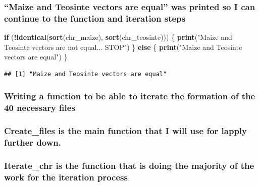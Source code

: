 \documentclass[
]{article}
\newenvironment{Shaded}{\begin{snugshade}}{\end{snugshade}}
\newcommand{\ControlFlowTok}[1]{\textcolor[rgb]{0.13,0.29,0.53}{\textbf{#1}}}
\newcommand{\FunctionTok}[1]{\textcolor[rgb]{0.13,0.29,0.53}{\textbf{#1}}}
\newcommand{\NormalTok}[1]{#1}
\newcommand{\SpecialCharTok}[1]{\textcolor[rgb]{0.81,0.36,0.00}{\textbf{#1}}}
\newcommand{\StringTok}[1]{\textcolor[rgb]{0.31,0.60,0.02}{#1}}
\begin{document}
\subsubsection{``Maize and Teosinte vectors are equal'' was printed so I
can continue to the function and iteration
steps}\label{maize-and-teosinte-vectors-are-equal-was-printed-so-i-can-continue-to-the-function-and-iteration-steps}

\begin{Shaded}
\begin{Highlighting}[]
\ControlFlowTok{if}\NormalTok{ (}\SpecialCharTok{!}\FunctionTok{identical}\NormalTok{(}\FunctionTok{sort}\NormalTok{(chr\_maize), }\FunctionTok{sort}\NormalTok{(chr\_teosinte))) \{}
  \FunctionTok{print}\NormalTok{(}\StringTok{"Maize and Teosinte vectors are not equal... STOP"}\NormalTok{) }
\NormalTok{\} }\ControlFlowTok{else}\NormalTok{ \{}
   \FunctionTok{print}\NormalTok{(}\StringTok{"Maize and Teosinte vectors are equal"}\NormalTok{)}
\NormalTok{  \}}
\end{Highlighting}
\end{Shaded}

\begin{verbatim}
## [1] "Maize and Teosinte vectors are equal"
\end{verbatim}

\subsubsection{Writing a function to be able to iterate the formation of
the 40 necessary
files}\label{writing-a-function-to-be-able-to-iterate-the-formation-of-the-40-necessary-files}

\subsubsection{Create\_files is the main function that I will use for
lapply further
down.}\label{create_files-is-the-main-function-that-i-will-use-for-lapply-further-down.}

\subsubsection{Iterate\_chr is the function that is doing the majority
of the work for the iteration
process}\label{iterate_chr-is-the-function-that-is-doing-the-majority-of-the-work-for-the-iteration-process}
\end{document}
